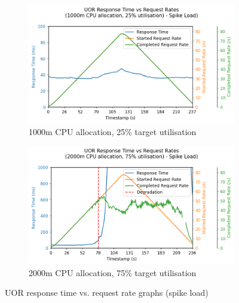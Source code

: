\begin{figure}[h]
    \centering
    \begin{subfigure}{.5\textwidth}
      \centering
      \includegraphics[width=\linewidth]{figures/uor-rau-i5-spike-rt-graph.png}
      \caption{1000m CPU allocation, 25\% target utilisation}
    \end{subfigure}%
    \begin{subfigure}{.5\textwidth}
      \centering
      \includegraphics[width=\linewidth]{figures/uor-rau-i11-spike-rt-graph.png}
      \caption{2000m CPU allocation, 75\% target utilisation}
    \end{subfigure}

    \caption{UOR response time vs. request rate graphs (spike load)}
    \label{figure:uor-resource-allocation-rt-graph-i5-i11-spike}
\end{figure}

